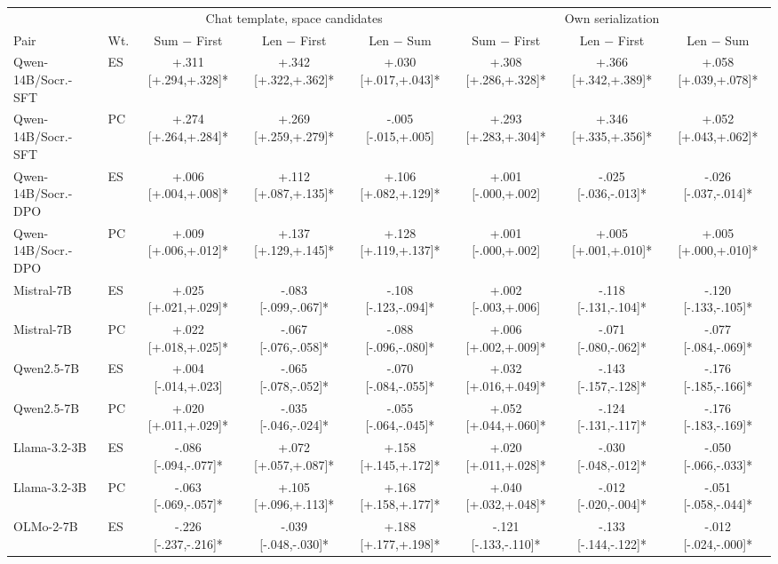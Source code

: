 \begin{table}[t]
\centering\scriptsize
\setlength{\tabcolsep}{0.9pt}
\begin{tabular}{@{}llccc@{\hspace{8pt}}ccc@{}}
\toprule
& & \multicolumn{3}{c}{Chat template, space candidates} & \multicolumn{3}{c}{Own serialization} \\
\cmidrule(lr){3-5}\cmidrule(l){6-8}
Pair & Wt. & Sum $-$ First & Len $-$ First & Len $-$ Sum & Sum $-$ First & Len $-$ First & Len $-$ Sum \\
\midrule
Qwen-14B/Socr.-SFT & ES & +.311 [+.294,+.328]* & +.342 [+.322,+.362]* & +.030 [+.017,+.043]* & +.308 [+.286,+.328]* & +.366 [+.342,+.389]* & +.058 [+.039,+.078]* \\
Qwen-14B/Socr.-SFT & PC & +.274 [+.264,+.284]* & +.269 [+.259,+.279]* & -.005 [-.015,+.005] & +.293 [+.283,+.304]* & +.346 [+.335,+.356]* & +.052 [+.043,+.062]* \\
Qwen-14B/Socr.-DPO & ES & +.006 [+.004,+.008]* & +.112 [+.087,+.135]* & +.106 [+.082,+.129]* & +.001 [-.000,+.002] & -.025 [-.036,-.013]* & -.026 [-.037,-.014]* \\
Qwen-14B/Socr.-DPO & PC & +.009 [+.006,+.012]* & +.137 [+.129,+.145]* & +.128 [+.119,+.137]* & +.001 [-.000,+.002] & +.005 [+.001,+.010]* & +.005 [+.000,+.010]* \\
Mistral-7B & ES & +.025 [+.021,+.029]* & -.083 [-.099,-.067]* & -.108 [-.123,-.094]* & +.002 [-.003,+.006] & -.118 [-.131,-.104]* & -.120 [-.133,-.105]* \\
Mistral-7B & PC & +.022 [+.018,+.025]* & -.067 [-.076,-.058]* & -.088 [-.096,-.080]* & +.006 [+.002,+.009]* & -.071 [-.080,-.062]* & -.077 [-.084,-.069]* \\
Qwen2.5-7B & ES & +.004 [-.014,+.023] & -.065 [-.078,-.052]* & -.070 [-.084,-.055]* & +.032 [+.016,+.049]* & -.143 [-.157,-.128]* & -.176 [-.185,-.166]* \\
Qwen2.5-7B & PC & +.020 [+.011,+.029]* & -.035 [-.046,-.024]* & -.055 [-.064,-.045]* & +.052 [+.044,+.060]* & -.124 [-.131,-.117]* & -.176 [-.183,-.169]* \\
Llama-3.2-3B & ES & -.086 [-.094,-.077]* & +.072 [+.057,+.087]* & +.158 [+.145,+.172]* & +.020 [+.011,+.028]* & -.030 [-.048,-.012]* & -.050 [-.066,-.033]* \\
Llama-3.2-3B & PC & -.063 [-.069,-.057]* & +.105 [+.096,+.113]* & +.168 [+.158,+.177]* & +.040 [+.032,+.048]* & -.012 [-.020,-.004]* & -.051 [-.058,-.044]* \\
OLMo-2-7B & ES & -.226 [-.237,-.216]* & -.039 [-.048,-.030]* & +.188 [+.177,+.198]* & -.121 [-.133,-.110]* & -.133 [-.144,-.122]* & -.012 [-.024,-.000]* \\

\end{tabular}
\end{table}
